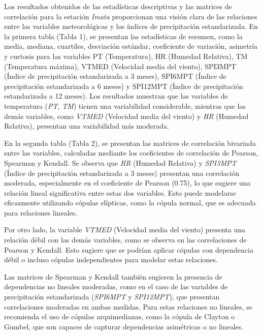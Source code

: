 \begin{figure}[htbp]
\end{figure}

Los resultados obtenidos de las estadísticas descriptivas y las matrices de correlación para la estación \textit{Imata} proporcionan una visión clara de las relaciones entre las variables meteorológicas y los índices de precipitación estandarizada. En la primera tabla (Tabla 1), se presentan las estadísticas de resumen, como la media, mediana, cuartiles, desviación estándar, coeficiente de variación, asimetría y curtosis para las variables PT (Temperatura), HR (Humedad Relativa), TM (Temperatura máxima), VTMED (Velocidad media del viento), SPI3MPT (Índice de precipitación estandarizada a 3 meses), SPI6MPT (Índice de precipitación estandarizada a 6 meses) y SPI12MPT (Índice de precipitación estandarizada a 12 meses). Los resultados muestran que las variables de temperatura (\textit{PT}, \textit{TM}) tienen una variabilidad considerable, mientras que las demás variables, como \textit{VTMED} (Velocidad media del viento) y \textit{HR} (Humedad Relativa), presentan una variabilidad más moderada.

En la segunda tabla (Tabla 2), se presentan las matrices de correlación bivariada entre las variables, calculadas mediante los coeficientes de correlación de Pearson, Spearman y Kendall. Se observa que \textit{HR} (Humedad Relativa) y \textit{SPI3MPT} (Índice de precipitación estandarizada a 3 meses) presentan una correlación moderada, especialmente en el coeficiente de Pearson (0.75), lo que sugiere una relación lineal significativa entre estas dos variables. Esto puede modelarse eficazmente utilizando cópulas elípticas, como la cópula normal, que es adecuada para relaciones lineales. 

Por otro lado, la variable \textit{VTMED} (Velocidad media del viento) presenta una relación débil con las demás variables, como se observa en las correlaciones de Pearson y Kendall. Esto sugiere que se podrían aplicar cópulas con dependencia débil o incluso cópulas independientes para modelar estas relaciones.

Las matrices de Spearman y Kendall también sugieren la presencia de dependencias no lineales moderadas, como en el caso de las variables de precipitación estandarizada (\textit{SPI6MPT} y \textit{SPI12MPT}), que presentan correlaciones moderadas en ambas medidas. Para estas relaciones no lineales, se recomienda el uso de cópulas arquimedianas, como la cópula de Clayton o Gumbel, que son capaces de capturar dependencias asimétricas o no lineales.

